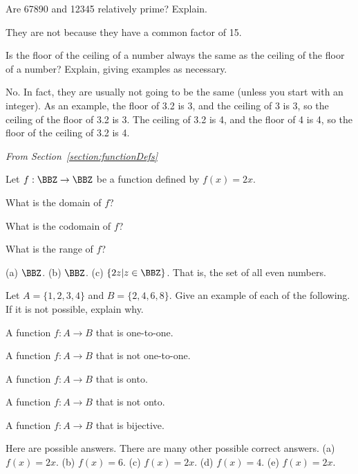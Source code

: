 \begin{requ}
Are 67890 and 12345 relatively prime? Explain.
\begin{requanswer}
They are not because they have a common factor of 15.
\end{requanswer}
\end{requ}


\begin{requ}
Is the floor of the ceiling of a number always the same as the ceiling of the floor of a number? 
Explain, giving examples as necessary.
\begin{requanswer}
No. In fact, they are usually not going to be the same (unless you start with an integer).
As an example, the floor of 3.2 is 3, and the ceiling of 3 is 3, so the ceiling of the floor of 3.2 is 3. 
The ceiling of 3.2 is 4, and the floor of 4 is 4, so the floor of the ceiling of 3.2 is 4.
\end{requanswer}
\end{requ}


\medskip
\noindent
{\em From Section~\ref{section:functionDefs}}



\begin{requ}
Let $f:\BBZ \rightarrow \BBZ$ be a function defined by $f(x)=2x$.
\begin{lenum}
\item What is the domain of $f$? 
\item What is the codomain of $f$? 
\item What is the range of $f$? 
\end{lenum}
\begin{requanswer}
(a) $\BBZ$. (b) $\BBZ$. (c) $\{2z | z\in\BBZ\}$. That is, the set of all even numbers.
\end{requanswer}
\end{requ}

\begin{requ}
Let $A=\{1,2,3,4\}$ and $B=\{2,4,6,8\}$.
Give an example of each of the following. If it is not possible, explain why.
\begin{lenum}
\item A function $f:A\rightarrow B$ that is one-to-one.
\item A function $f:A\rightarrow B$ that is not one-to-one.
\item A function $f:A\rightarrow B$ that is onto.
\item A function $f:A\rightarrow B$ that is not onto.
\item A function $f:A\rightarrow B$ that is bijective.
\end{lenum}
\begin{requanswer}
Here are possible answers. There are many other possible correct answers.
(a) $f(x)=2x$.
(b) $f(x)=6$.
(c) $f(x)=2x$.
(d) $f(x)=4$.
(e) $f(x)=2x$.
\end{requanswer}
\end{requ}

